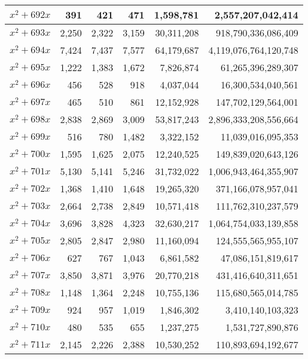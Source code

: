 \documentclass[a4paper]{amsproc}
\theoremstyle{plain}
\begin{document}
\begin{longtable}{ | l | r | r | r | r | r | }
$x^2 + 692x$ & 391 & 421 & 471 & 1{,}598{,}781 & 2{,}557{,}207{,}042{,}414 \\ \hline
$x^2 + 693x$ & 2{,}250 & 2{,}322 & 3{,}159 & 30{,}311{,}208 & 918{,}790{,}336{,}086{,}409 \\ \hline
$x^2 + 694x$ & 7{,}424 & 7{,}437 & 7{,}577 & 64{,}179{,}687 & 4{,}119{,}076{,}764{,}120{,}748 \\ \hline
$x^2 + 695x$ & 1{,}222 & 1{,}383 & 1{,}672 & 7{,}826{,}874 & 61{,}265{,}396{,}289{,}307 \\ \hline
$x^2 + 696x$ & 456 & 528 & 918 & 4{,}037{,}044 & 16{,}300{,}534{,}040{,}561 \\ \hline
$x^2 + 697x$ & 465 & 510 & 861 & 12{,}152{,}928 & 147{,}702{,}129{,}564{,}001 \\ \hline
$x^2 + 698x$ & 2{,}838 & 2{,}869 & 3{,}009 & 53{,}817{,}243 & 2{,}896{,}333{,}208{,}556{,}664 \\ \hline
$x^2 + 699x$ & 516 & 780 & 1{,}482 & 3{,}322{,}152 & 11{,}039{,}016{,}095{,}353 \\ \hline
$x^2 + 700x$ & 1{,}595 & 1{,}625 & 2{,}075 & 12{,}240{,}525 & 149{,}839{,}020{,}643{,}126 \\ \hline
$x^2 + 701x$ & 5{,}130 & 5{,}141 & 5{,}246 & 31{,}732{,}022 & 1{,}006{,}943{,}464{,}355{,}907 \\ \hline
$x^2 + 702x$ & 1{,}368 & 1{,}410 & 1{,}648 & 19{,}265{,}320 & 371{,}166{,}078{,}957{,}041 \\ \hline
$x^2 + 703x$ & 2{,}664 & 2{,}738 & 2{,}849 & 10{,}571{,}418 & 111{,}762{,}310{,}237{,}579 \\ \hline
$x^2 + 704x$ & 3{,}696 & 3{,}828 & 4{,}323 & 32{,}630{,}217 & 1{,}064{,}754{,}033{,}139{,}858 \\ \hline
$x^2 + 705x$ & 2{,}805 & 2{,}847 & 2{,}980 & 11{,}160{,}094 & 124{,}555{,}565{,}955{,}107 \\ \hline
$x^2 + 706x$ & 627 & 767 & 1{,}043 & 6{,}861{,}582 & 47{,}086{,}151{,}819{,}617 \\ \hline
$x^2 + 707x$ & 3{,}850 & 3{,}871 & 3{,}976 & 20{,}770{,}218 & 431{,}416{,}640{,}311{,}651 \\ \hline
$x^2 + 708x$ & 1{,}148 & 1{,}364 & 2{,}248 & 10{,}755{,}136 & 115{,}680{,}565{,}014{,}785 \\ \hline
$x^2 + 709x$ & 924 & 957 & 1{,}019 & 1{,}846{,}302 & 3{,}410{,}140{,}103{,}323 \\ \hline
$x^2 + 710x$ & 480 & 535 & 655 & 1{,}237{,}275 & 1{,}531{,}727{,}890{,}876 \\ \hline
$x^2 + 711x$ & 2{,}145 & 2{,}226 & 2{,}388 & 10{,}530{,}252 & 110{,}893{,}694{,}192{,}677 \\ \hline

\end{longtable}
\end{document}
